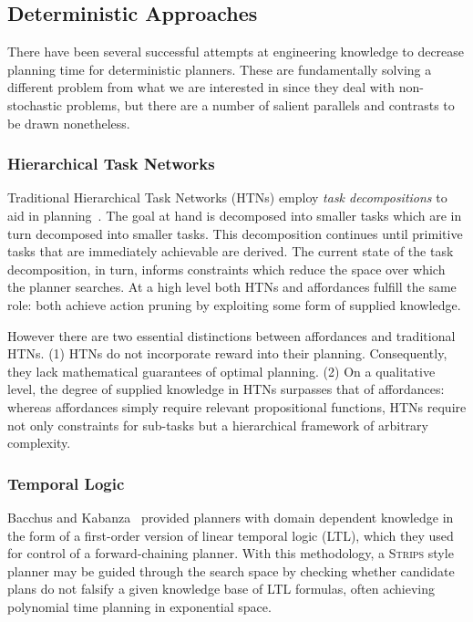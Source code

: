 \documentclass[letterpaper]{article}
\begin{document}
\subsection{Deterministic Approaches}

There have been several successful attempts at engineering knowledge to
decrease planning time for deterministic planners. These are fundamentally solving
a different problem from what we are interested in since they deal with non-stochastic problems, but there are a number of salient parallels and contrasts to be drawn nonetheless.

\subsubsection{Hierarchical Task Networks}
Traditional Hierarchical Task Networks (HTNs) employ \textit{task decompositions} to aid in planning~\cite{erol1994htn}. The goal at hand is decomposed into smaller tasks which are in turn decomposed into smaller tasks. This decomposition continues until primitive tasks that are immediately achievable are derived. The current state of the task decomposition, in turn, informs constraints which reduce the space over which the planner searches. At a high level both HTNs and affordances fulfill the same role: both achieve action pruning by exploiting some form of supplied knowledge. 

However there are two essential distinctions between affordances and traditional HTNs.  (1) HTNs do not incorporate reward into their planning. Consequently, they lack mathematical guarantees of optimal planning. (2) On a qualitative level, the degree of supplied knowledge in HTNs surpasses that of affordances: whereas affordances simply require relevant propositional functions, HTNs require not only constraints for sub-tasks but a hierarchical framework of arbitrary complexity.

\subsubsection{Temporal Logic}
Bacchus and Kabanza~\cite{Bacchus95usingtemporal,Bacchus99usingtemporal} provided
planners with domain dependent knowledge in the form of a first-order version of linear
temporal logic (LTL), which they used for control of a forward-chaining planner. With this methodology, 
a \textsc{Strips} style planner may be guided through the search space by checking 
whether candidate plans do not falsify a given knowledge base of LTL formulas, often
achieving polynomial time planning in exponential space.
\end{document}
